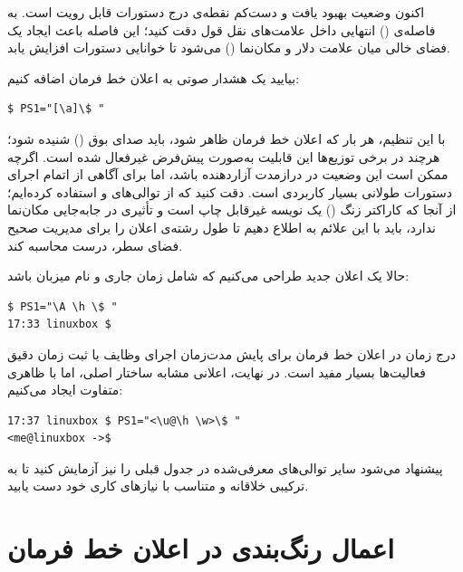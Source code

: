 اکنون وضعیت بهبود یافت و دست‌کم نقطه‌ی درج دستورات قابل رویت است. به فاصله‌ی () انتهایی داخل علامت‌های نقل قول دقت کنید؛ این فاصله باعث ایجاد یک فضای خالی میان علامت دلار و مکان‌نما () می‌شود تا خوانایی دستورات افزایش یابد.

بیایید یک هشدار صوتی به اعلان خط فرمان اضافه کنیم:

\begin{latin}
\begin{lstlisting}
$ PS1="[\a]\$ "
\end{lstlisting}
\end{latin}

با این تنظیم، هر بار که اعلان خط فرمان ظاهر شود، باید صدای بوق () شنیده شود؛ هرچند در برخی توزیع‌ها این قابلیت به‌صورت پیش‌فرض غیرفعال شده است. اگرچه ممکن است این وضعیت در درازمدت آزاردهنده باشد، اما برای آگاهی از اتمام اجرای دستورات طولانی بسیار کاربردی است. دقت کنید که از توالی‌های \cmd{\textbackslash [} و \cmd{\textbackslash ]} استفاده کرده‌ایم؛ از آنجا که کاراکتر زنگ () یک نویسه غیرقابل چاپ است و تأثیری در جابه‌جایی مکان‌نما ندارد، باید با این علائم به  اطلاع دهیم تا طول رشته‌ی اعلان را برای مدیریت صحیح فضای سطر، درست محاسبه کند.

حالا یک اعلان جدید طراحی می‌کنیم که شامل زمان جاری و نام میزبان باشد:

\begin{latin}
\begin{lstlisting}
$ PS1="\A \h \$ "
17:33 linuxbox $
\end{lstlisting}
\end{latin}

درج زمان در اعلان خط فرمان برای پایش مدت‌زمان اجرای وظایف یا ثبت زمان دقیق فعالیت‌ها بسیار مفید است. در نهایت، اعلانی مشابه ساختار اصلی، اما با ظاهری متفاوت ایجاد می‌کنیم:

\begin{latin}
\begin{lstlisting}
17:37 linuxbox $ PS1="<\u@\h \w>\$ "
<me@linuxbox ->$
\end{lstlisting}
\end{latin}

پیشنهاد می‌شود سایر توالی‌های معرفی‌شده در جدول قبلی را نیز آزمایش کنید تا به ترکیبی خلاقانه و متناسب با نیازهای کاری خود دست یابید.

\section{اعمال رنگ‌بندی در اعلان خط فرمان}

